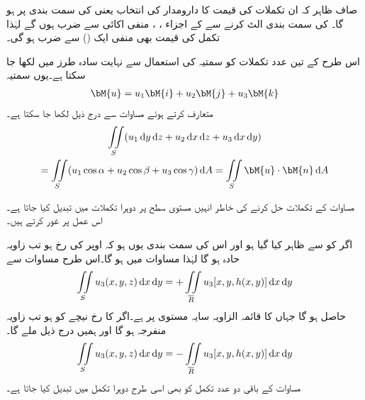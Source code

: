 صاف ظاہر کہ ان تکملات کی قیمت کا دارومدار  کی انتخاب یعنی  کی سمت بندی پر ہو گا۔ کی سمت بندی الٹ کرنے سے  کے اجزاء ، ،  منفی اکائی سے ضرب ہوں گے لہٰذا  تکمل کی قیمت بھی منفی ایک () سے ضرب ہو گی۔

اس طرح کے تین عدد تکملات کو سمتیہ کی استعمال سے نہایت سادہ طرز میں لکھا جا سکتا ہے۔یوں سمتیہ
\begin{align*}
\bM{u}=u_1\bM{i}+u_2\bM{j}+u_3\bM{k}
\end{align*}
متعارف کرتے ہوئے  مساوات  سے درج ذیل لکھا جا سکتا ہے۔
\begin{multline}
\iint\limits_S (u_1\dif y\dif z+u_2\dif x\dif z+u_3\dif x\dif y)\\
=\iint\limits_S (u_1\cos \alpha +u_2\cos \beta+u_3\cos \gamma)\dif A=\iint\limits_S \bM{u}\cdot \bM{n}\dif A
\end{multline}

مساوات  کے تکملات حل کرنے کی خاطر انہیں مستوی سطح پر دوہرا تکملات میں تبدیل کیا جاتا ہے۔اس عمل پر غور کرتے ہیں۔

اگر  کو  سے ظاہر کیا گیا ہو اور اس کی سمت بندی یوں ہو کہ  اوپر کی رخ ہو تب  زاویہ حادہ ہو گا لہٰذا مساوات  میں  ہو گا۔اس طرح مساوات  سے 
\begin{align}
\iint\limits_S u_3(x,y,z)\dif x\dif y=+\iint\limits_{\overline{R}} u_3[x,y,h(x,y)]\dif x\dif y
\end{align}
حاصل ہو گا جہاں   کا قائمہ الزاویہ سایہ  مستوی پر  ہے۔اگر  کا رخ نیچے کو ہو تب  زاویہ منفرجہ ہو گا اور ہمیں درج ذیل ملے گا۔
\begin{align}
\iint\limits_S u_3(x,y,z)\dif x\dif y=-\iint\limits_{\overline{R}} u_3[x,y,h(x,y)]\dif x\dif y
\end{align}
مساوات  کے باقی دو عدد تکمل کو بھی اسی طرح دوہرا تکمل میں تبدیل کیا جاتا ہے۔


